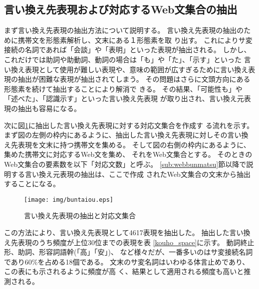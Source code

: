 \documentclass[jnlpbbl]{jnlp_j}
\begin{document}
\subsection{言い換え先表現および対応するWeb文集合の抽出}\label{sub:kouho}

まず言い換え先表現の抽出方法について説明する。
言い換え先表現の抽出のために携帯文を形態素解析し、文末にある１形態素を取
り出す。
これによりサ変接続の名詞であれば「会談」や「表明」といった表現が抽出される。
しかし、これだけでは助詞や助動詞、動詞の場合は「も」や「た」、「示す」といった
言い換え表現として使用が難しい表現や、意味の範囲が広すぎるために言い換え表
現の抽出が困難な表現が抽出されてしまう。
その問題はさらに文頭方向にある形態素を続けて抽出することにより解消で
きる。
その結果、「可能性も」や「述べた」、「認識示す」といった言い換え先表現
が取り出され、言い換え元表現の抽出も容易になる。

次に図\ref{buntaiou}に抽出した言い換え先表現に対する対応文集合を作成す
る流れを示す。
まず図の左側の枠内にあるように、抽出した言い換え先表現に対しその言い換
え先表現を文末に持つ携帯文を集める。
そして図の右側の枠内にあるように、集めた携帯文に対応するWeb文を集め、
それをWeb文集合とする。
そのときのWeb文集合の要素数を以下「対応文数」と呼ぶ。
\ref{sub:webbunmatsu}節以降で説明する言い換え元表現の抽出は、ここで作成
されたWeb文集合の文末から抽出することになる。


\begin{figure}[htb]
\begin{center}
\texttt{[image: img/buntaiou.eps]}
\caption{言い換え先表現の抽出と対応文集合}
\label{buntaiou}
\end{center}
\end{figure}

この方法により、言い換え先表現として4617表現を抽出した。
抽出した言い換え先表現のうち頻度が上位30位までの表現を表
\ref{kouho_space}に示す。
動詞終止形、助詞、形容詞語幹(「高」「安」)、
など様々だが、一番多いのはサ変接続名詞であり60\%を占める18個である。
文末のサ変名詞はいわゆる体言止めであり、この表にも示されるように頻度が高
く、結果として適用される頻度も高いと推測される。
\end{document}

